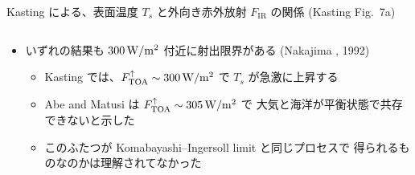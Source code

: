 \documentclass[aspectratio=149,9pt]{beamer}
\newcommand{\hmTOA}{\mathrm{TOA}}
\begin{document}
\begin{frame}
\begin{columns}[T,onlytextwidth]
\begin{column}{.3\textwidth}
			\tiny
			Kasting による、表面温度 \(T_s\) と外向き赤外放射 \(F_\mathrm{IR}\) の関係
			(Kasting Fig.~7a)
		\end{column}
	\end{columns}
	\begin{itemize}
		\item いずれの結果も \(300\hmu{W/m^2}\) 付近に射出限界がある
			(Nakajima \etal*, 1992)
			\begin{itemize}
				\item Kasting では、\(F^\uparrow_\hmTOA\sim300\hmu{W/m^2}\) で \(T_s\)
					が急激に上昇する
				\item Abe and Matusi は \(F^\uparrow_\hmTOA\sim305\hmu{W/m^2}\) で
					大気と海洋が平衡状態で共存できないと示した
				\item このふたつが Komabayashi--Ingersoll limit と同じプロセスで
					得られるものなのかは理解されてなかった
			\end{itemize}
	\end{itemize}
\end{frame}
\end{document}
